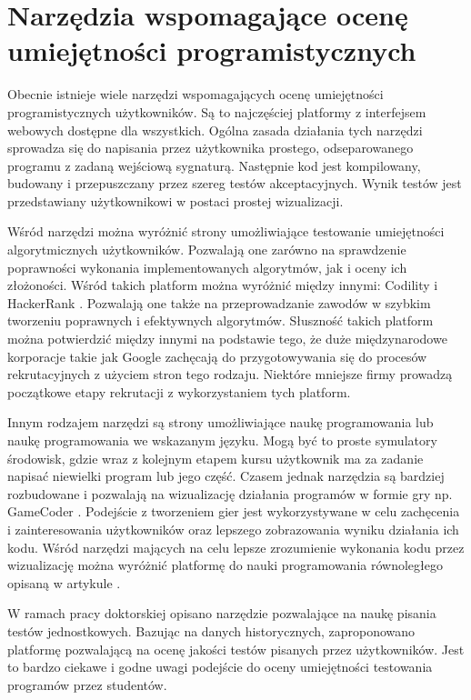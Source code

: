 \section{Narzędzia wspomagające ocenę umiejętności programistycznych}

Obecnie istnieje wiele narzędzi wspomagających ocenę umiejętności programistycznych użytkowników.
Są to najczęściej platformy z interfejsem webowych dostępne dla wszystkich.
Ogólna zasada działania tych narzędzi sprowadza się do napisania przez użytkownika prostego, odseparowanego programu z zadaną wejściową sygnaturą.
Następnie kod jest kompilowany, budowany i przepuszczany przez szereg testów akceptacyjnych.
Wynik testów jest przedstawiany użytkownikowi w postaci prostej wizualizacji.

Wśród narzędzi można wyróżnić strony umożliwiające testowanie umiejętności algorytmicznych użytkowników.
Pozwalają one zarówno na sprawdzenie poprawności wykonania implementowanych algorytmów, jak i oceny ich złożoności.
Wśród takich platform można wyróżnić między innymi: Codility \cite{codility} i HackerRank \cite{hacker-rank}. 
Pozwalają one także na przeprowadzanie zawodów w szybkim tworzeniu poprawnych i efektywnych algorytmów. 
Słuszność takich platform można potwierdzić między innymi na podstawie tego, że duże międzynarodowe korporacje takie jak Google zachęcają do przygotowywania się do procesów rekrutacyjnych z użyciem stron tego rodzaju. 
Niektóre mniejsze firmy prowadzą początkowe etapy rekrutacji z wykorzystaniem tych platform.

Innym rodzajem narzędzi są strony umożliwiające naukę programowania lub naukę programowania we wskazanym języku. 
Mogą być to proste symulatory środowisk, gdzie wraz z kolejnym etapem kursu użytkownik ma za zadanie napisać niewielki program lub jego część.
Czasem jednak narzędzia są bardziej rozbudowane i pozwalają na wizualizację działania programów w formie gry np. GameCoder \cite{game-coder}.
Podejście z tworzeniem gier jest wykorzystywane w celu zachęcenia i zainteresowania użytkowników oraz lepszego zobrazowania wyniku działania ich kodu.
Wśród narzędzi mających na celu lepsze zrozumienie wykonania kodu przez wizualizację można wyróżnić platformę do nauki programowania równoległego opisaną w artykule \cite{pharaller-platform}.

W ramach pracy doktorskiej \cite{teach-testing-thesis} opisano narzędzie pozwalające na naukę pisania testów jednostkowych.
Bazując na danych historycznych, zaproponowano platformę pozwalającą na ocenę jakości testów pisanych przez użytkowników.
Jest to bardzo ciekawe i godne uwagi podejście do oceny umiejętności testowania programów przez studentów.

